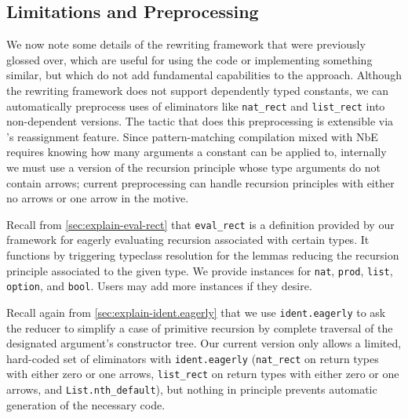 \subsection{Limitations and Preprocessing}\label{sec:implementation-and-usage}


We now note some details of the rewriting framework that were previously glossed over, which are useful for using the code or implementing something similar, but which do not add fundamental capabilities to the approach.
Although the rewriting framework does not support dependently typed constants, we can automatically preprocess uses of eliminators like \texttt{nat_rect} and \texttt{list_rect} into non-dependent versions.
The tactic that does this preprocessing is extensible via \Ltac{}'s reassignment feature.
Since pattern-matching compilation mixed with NbE requires knowing how many arguments a constant can be applied to, internally we must use a version of the recursion principle whose type arguments do not contain arrows; current preprocessing can handle recursion principles with either no arrows or one arrow in the motive.

Recall from \autoref{sec:explain-eval-rect} that \texttt{eval_rect} is a definition provided by our framework for eagerly evaluating recursion associated with certain types.
It functions by triggering typeclass resolution for the lemmas reducing the recursion principle associated to the given type.
We provide instances for \texttt{nat}, \texttt{prod}, \texttt{list}, \texttt{option}, and \texttt{bool}.
Users may add more instances if they desire.

Recall again from \autoref{sec:explain-ident.eagerly} that we use \texttt{ident.eagerly} to ask the reducer to simplify a case of primitive recursion by complete traversal of the designated argument's constructor tree.
Our current version only allows a limited, hard-coded set of eliminators with \texttt{ident.eagerly} (\texttt{nat\_rect} on return types with either zero or one arrows, \texttt{list\_rect} on return types with either zero or one arrows, and \texttt{List.nth\_default}), but nothing in principle prevents automatic generation of the necessary code.

